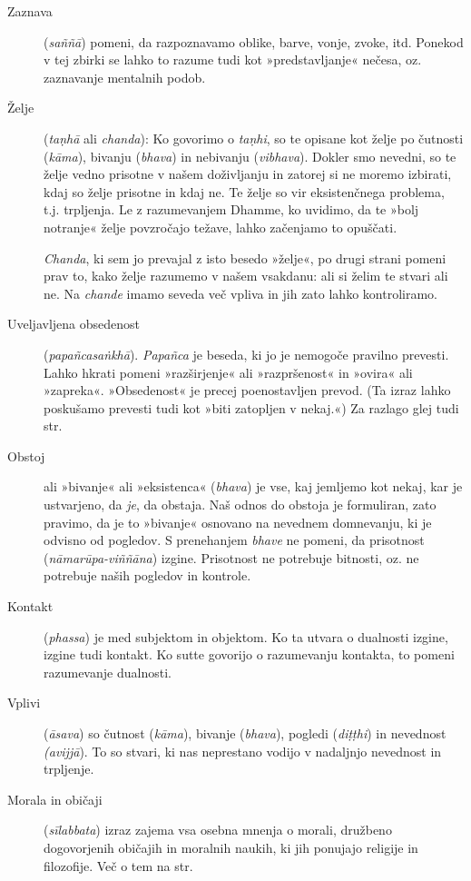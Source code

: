 \begin{description}
\item[Zaznava] (\emph{saññā}) pomeni, da razpoznavamo oblike, barve,
vonje, zvoke, itd. Ponekod v tej zbirki se lahko to razume tudi kot
»predstavljanje« nečesa, oz. zaznavanje mentalnih podob.

\item[Želje] (\emph{taṇhā} ali \emph{chanda}): Ko govorimo o
\emph{taṇhi}, so te opisane kot želje po čutnosti (\emph{kāma}), bivanju
(\emph{bhava}) in nebivanju (\emph{vibhava}). Dokler smo nevedni, so te
želje vedno prisotne v našem doživljanju in zatorej si ne moremo
izbirati, kdaj so želje prisotne in kdaj ne. Te želje so vir
eksistenčnega problema, t.j. trpljenja. Le z razumevanjem Dhamme, ko
uvidimo, da te »bolj notranje« želje povzročajo težave, lahko začenjamo
to opuščati.

\emph{Chanda}, ki sem jo prevajal z isto besedo »želje«, po drugi
strani pomeni prav to, kako želje razumemo v našem vsakdanu: ali si
želim te stvari ali ne. Na \emph{chande} imamo seveda več vpliva in jih
zato lahko kontroliramo.

\item[Uveljavljena obsedenost] (\emph{papañcasaṅkhā}).
\emph{Papañca} je beseda, ki jo je nemogoče pravilno prevesti. Lahko
hkrati pomeni »razširjenje« ali »razpršenost« in »ovira« ali »zapreka«.
»Obsedenost« je precej poenostavljen prevod. (Ta izraz lahko poskušamo
prevesti tudi kot »biti zatopljen v nekaj.«) Za razlago glej tudi str.

\item[Obstoj] ali »bivanje« ali »eksistenca«
(\emph{bhava}) je vse, kaj jemljemo kot nekaj, kar je ustvarjeno, da
\emph{je}, da obstaja. Naš odnos do obstoja je formuliran, zato pravimo,
da je to »bivanje« osnovano na nevednem domnevanju, ki je odvisno od
pogledov. S prenehanjem \emph{bhave} ne pomeni, da prisotnost
(\emph{nāmarūpa-viññāna}) izgine. Prisotnost ne potrebuje bitnosti, oz.
ne potrebuje naših pogledov in kontrole.

\item[Kontakt] (\emph{phassa}) je med subjektom in objektom. Ko ta
utvara o dualnosti izgine, izgine tudi kontakt. Ko sutte govorijo o
razumevanju kontakta, to pomeni razumevanje dualnosti.

\item[Vplivi] (\emph{āsava}) so čutnost (\emph{kāma}), bivanje
(\emph{bhava}), pogledi (\emph{diṭṭhi}) in nevednost \emph{(avijjā}). To
so stvari, ki nas neprestano vodijo v nadaljnjo nevednost in trpljenje.

\item[Morala in običaji] (\emph{sīlabbata}) izraz zajema vsa osebna
mnenja o morali, družbeno dogovorjenih običajih in moralnih naukih, ki
jih ponujajo religije in filozofije. Več o tem na str.

\end{description}

